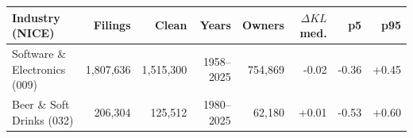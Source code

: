 \begin{tabular}{lrrrrrrr}
\toprule
Industry (NICE) & Filings & Clean & Years & Owners & $\Delta KL$ med. & p5 & p95 \\
\midrule
Software \& Electronics (009) & 1,807,636 & 1,515,300 & 1958--2025 & 754,869 & -0.02 & -0.36 & +0.45 \\
Beer \& Soft Drinks (032) & 206,304 & 125,512 & 1980--2025 & 62,180 & +0.01 & -0.53 & +0.60 \\
\bottomrule
\end{tabular}
